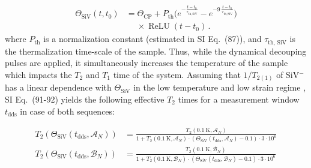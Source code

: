 \documentclass[%
 reprint,
 superscriptaddress,
 amsmath,amssymb,
 aps,
 prx,
]{revtex4-2}
\begin{document}
\begin{equation}
\begin{split}
  \Theta_{\mathrm{SiV}}(t,t_{0})
  &= \Theta_{\mathrm{CP}}
    + P_{\mathrm{th}}\bigl(
       e^{-\frac{t-t_{0}}{\tau_{\mathrm{th,SiV}}}}
       - e^{-9\,\frac{t-t_{0}}{\tau_{\mathrm{th,SiV}}}}
      \bigr) \\
  &\quad\;\times \operatorname{ReLU}(t - t_{0}) \,.
\end{split}
\end{equation}
where $P_{\text{th}}$ is a normalization constant (estimated in SI Eq.~(87)), and $\tau_{\text{th, SiV}}$ is the thermalization time-scale of the sample. Thus, while the dynamical decouping pulses are applied, it simultaneously increases the temperature of the sample which impacts the $T_{2}$ and $T_{1}$ time of the system. Assuming that $1/T_{2(1)}$ of SiV$^{-}$ has a linear dependence with $\Theta_{\text{SiV}}$ in the low temperature and low strain regime \cite{pingault_coherent_2017, Jahnke_2015}, SI Eq.~(91-92) yields the following effective $T_{2}$ times for a measurement window $t_{\text{dds}}$ in case of both sequences:
\begin{widetext}
\begin{subequations}
    \begin{align}
       T_{2}(\Theta_{\text{SiV}}(t_{\text{dds}},\mathcal{A}_{N})) &= \frac{T_{2}(0.1~\text{K},\mathcal{A}_{N})}{1 + T_{2}(0.1~\text{K},\mathcal{A}_{N})\cdot(\Theta_{\text{SiV}}(t_{\text{dds}},\mathcal{A}_{N})-0.1)\cdot3\cdot10^{6}}\\[1.5ex]
       T_{2}(\Theta_{\text{SiV}}(t_{\text{dds}},\mathcal{B}_{N})) &= \frac{T_{2}(0.1~\text{K},\mathcal{B}_{N})}{1 + T_{2}(0.1~\text{K},\mathcal{B}_{N})\cdot(\Theta_{\text{SiV}}(t_{\text{dds}},\mathcal{B}_{N})-0.1)\cdot3\cdot10^{6}}
    \end{align}
\end{subequations}
\end{widetext}
\end{document}
